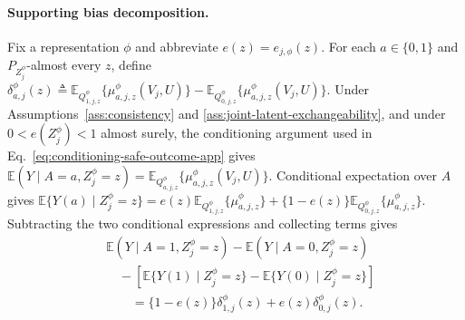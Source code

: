 \paragraph{Supporting bias decomposition.}
Fix a representation $\phi$ and abbreviate $e(z)=e_{j,\phi}(z)$. For each $a\in\{0,1\}$ and $P_{Z_j^\phi}$-almost every $z$, define
\(\delta_{a,j}^{\phi}(z) \triangleq \mathbb E_{Q_{1,j,z}^{\phi}}\{\mu_{a,j,z}^{\phi}(V_j,U)\} - \mathbb E_{Q_{0,j,z}^{\phi}}\{\mu_{a,j,z}^{\phi}(V_j,U)\}.\)
Under Assumptions~\ref{ass:consistency} and \ref{ass:joint-latent-exchangeability}, and under $0<e(Z_j^\phi)<1$ almost surely, the conditioning argument used in Eq.~\eqref{eq:conditioning-safe-outcome-app} gives
\(\mathbb E(Y\mid A=a,Z_j^\phi=z) = \mathbb E_{Q_{a,j,z}^{\phi}}\{\mu_{a,j,z}^{\phi}(V_j,U)\}.\)
Conditional expectation over $A$ gives
\(\mathbb E\{Y(a)\mid Z_j^\phi=z\} ={} e(z)\mathbb E_{Q_{1,j,z}^{\phi}}\{\mu_{a,j,z}^{\phi}\}+\{1-e(z)\}\mathbb E_{Q_{0,j,z}^{\phi}}\{\mu_{a,j,z}^{\phi}\}.\)
Subtracting the two conditional expressions and collecting terms gives
\begin{align}
&\mathbb E(Y\mid A=1,Z_j^\phi=z)
-\mathbb E(Y\mid A=0,Z_j^\phi=z)
\nonumber\\
&\quad-
\left[
\mathbb E\{Y(1)\mid Z_j^\phi=z\}
-
\mathbb E\{Y(0)\mid Z_j^\phi=z\}
\right]
\nonumber\\
&\qquad=
\{1-e(z)\}\delta_{1,j}^{\phi}(z)
+e(z)\delta_{0,j}^{\phi}(z).
\label{eq:pointwise-bias-decomposition}
\end{align}

